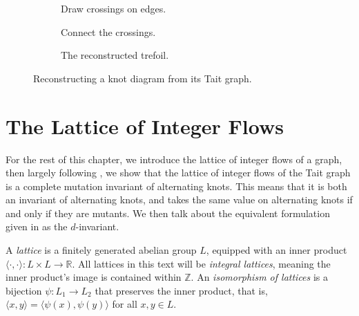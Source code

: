 \documentclass[12pt]{report}
\newcommand{\R}{\mathbb{R}}
\newcommand{\Z}{\mathbb{Z}}
\newcommand{\ip}[2]{\langle #1, #2 \rangle}
\theoremstyle{upright}
\begin{document}
\begin{figure}[h]
	\centering
	\hspace*{\fill}
	\begin{subfigure}[b]{0.3 \textwidth}
		\centering
		\def\svgscale{0.22}
		
		\caption{Draw crossings on edges.}
		\label{fig:trefoil-tait-with-crossings}
	\end{subfigure}
	\hspace*{\fill}
	\begin{subfigure}[b]{0.3 \textwidth}
		\centering
		\def\svgscale{0.22}
		
		\caption{Connect the crossings.}
		\label{fig:trefoil-resconstructed}
	\end{subfigure}
	\hspace*{\fill}
	\begin{subfigure}[b]{0.3 \textwidth}
		\centering
		\def\svgscale{0.2}
		
		\caption{The reconstructed trefoil.}
		\label{fig:trefoil-resconstructed-isotopy}
	\end{subfigure}
	\hspace*{\fill}
	\caption{Reconstructing a knot diagram from its Tait graph.}
	\label{fig:tait-reconstruction-example}
\end{figure}

\section{The Lattice of Integer Flows}

For the rest of this chapter, we introduce the lattice of integer flows of a graph, then largely following \cite{lattices-graphs-mutation}, we show that the lattice of integer flows of the Tait graph is a complete mutation invariant of alternating knots. This means that it is both an invariant of alternating knots, and takes the same value on alternating knots if and only if they are mutants. We then talk about the equivalent formulation given in \cite{lattices-graphs-mutation} as the $d$-invariant.

A \textit{lattice} is a finitely generated abelian group $L$, equipped with an inner product 
\({\ip{\cdot}{\cdot}: L \times L \longrightarrow \R}\). All lattices in this text will be \textit{integral lattices}, meaning the inner product's image is contained within $\Z$. An \textit{isomorphism of lattices} is a bijection $\psi: L_{1} \longrightarrow L_{2}$ that preserves the inner product, that is, ${\ip{x}{y} = \ip{\psi(x)}{\psi(y)}}$ for all $x, y \in L$.
\end{document}
